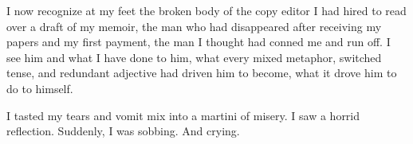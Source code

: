 I now recognize at my feet the broken body of the copy editor I had
hired to read over a draft of my memoir, the man who had
disappeared after receiving my papers and my first payment, the man
I thought had conned me and run off. I see him and what I have done
to him, what every mixed metaphor, switched tense, and redundant
adjective had driven him to become, what it drove him to do to
himself.



I tasted my tears and vomit mix into a martini of misery. I saw a
horrid reflection. Suddenly, I was sobbing. And crying. 

 



%
%
%
% 
%
%
%
%
%
%
%
%
%
%
%
%
%
% 
%
%
%
%
%
%
%
%
%
%
%
%
%
%
